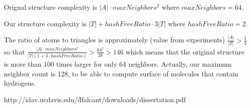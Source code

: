 Orignal structure complexity is $|A| \cdot maxNeighbors^2$ where $maxNeighbors = 64$.

Our structure complexity is $|T| + hashFreeRatio \cdot 3 |T|$ where $hashFreeRatio = 2$.

The ratio of atoms to triangles is approximately (value from experiments) $\frac{|A|}{|T|} > \frac{1}{4}$ so that $\frac{|A| \cdot maxNeighbors^2}{|T|(1 + 3 \cdot hashFreeRatio)} > \frac{64^2}{28} > 146$ which means that the original structure is more than 100 times larger for only 64 neighbors. Actually, our maximum neighbor count is 128, to be able to compute surface of molecules that contain hydrogens.

http://idav.ucdavis.edu/\~dfalcant/downloads/dissertation.pdf